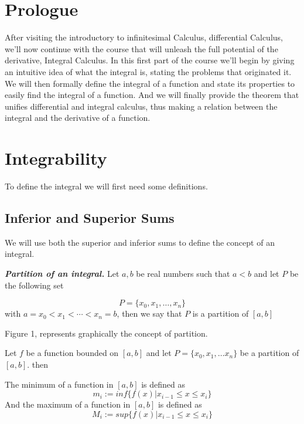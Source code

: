 \documentclass{report}
\begin{document}
    \tableofcontents

    \chapter*{Prologue}
    After visiting the introductory to infinitesimal Calculus, differential Calculus, we'll now continue with the course that will unleash the full potential of the derivative, Integral Calculus. In this first part of the course we'll begin by giving an intuitive idea of what the integral is, stating the problems that originated it. We will then formally define the integral of a function and state its properties to easily find the integral of a function. And we will finally provide the theorem that unifies differential and integral calculus, thus making a relation between the integral and the derivative of a function.

    \pagebreak
    \chapter{ Integrability }
    

    To define the integral we will first need some definitions.
    \section*{Inferior and Superior Sums}
    We will use both the superior and inferior sums to define the concept of an integral.

    \begin{defBox}
        \textit{\textbf{Partition of an integral.}} Let $a, b$ be real numbers such that $a<b$ and let $P$ be the following set

        $$P = \{x_0, x_1, \dots , x_n\}$$ with $a=x_0<x_1<\cdots<x_n=b$, then we say that $P$ is a partition of $[a,b]$
    \end{defBox}

    Figure 1, represents graphically the concept of partition.

    \begin{defBox}
        Let $f$ be a function bounded on $[a,b]$ and let $P = \{x_0, x_1, \dots x_n\}$ be a partition of $[a,b]$. then

        The minimum of a function in $[a,b]$ is defined as
        $$m_i := inf\{f(x) | x_{i-1} \leq x \leq x_i\}$$
        And the maximum of a function in $[a,b]$ is defined as
        $$M_i := sup\{f(x) | x_{i-1} \leq x \leq x_i\}$$
    \end{defBox}
\end{document}

